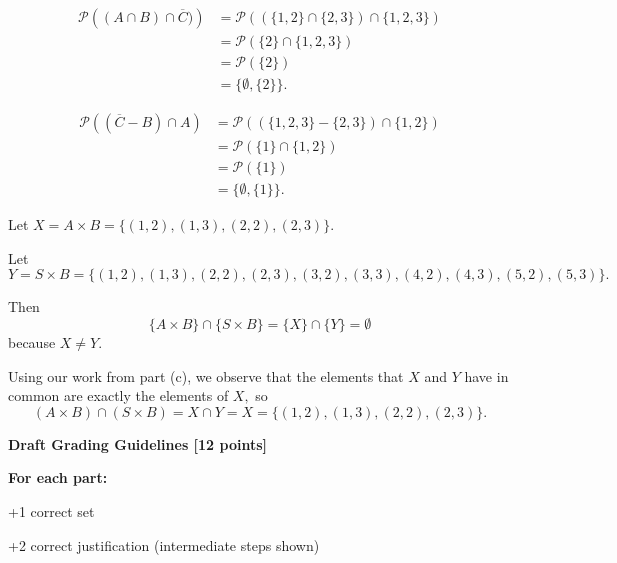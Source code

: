 \documentclass[12pt]{exam}
\begin{document}
\begin{solution}
\begin{qparts}
    \item \begin{align*}
        \mathcal{P}\left( (A \cap B) \cap \overline C ) \right) &= \mathcal{P}((\{1,2\} \cap \{2,3\})\cap \{1,2,3\}) \\
        &= \mathcal{P}(\{2\} \cap \{1,2,3\}) \\
        &= \mathcal{P}(\{2\}) \\
        &= \{\emptyset, \{2\}\}.
    \end{align*}

    \item \begin{align*}
        \mathcal{P} \left( ( \overline{C} - B ) \cap A \right) &= \mathcal{P}((\{1,2,3\} - \{2,3\}) \cap \{1,2\}) \\
        &= \mathcal{P}(\{1\} \cap \{1,2\}) \\
        &= \mathcal{P}(\{1\}) \\
        &= \{\emptyset , \{1\} \}.
    \end{align*}
    
    \item Let $X=A\times B=\{(1,2),(1,3),(2,2),(2,3)\}.$

    Let $Y=S\times B = \{(1,2),(1,3), (2,2),(2,3),(3,2),(3,3),(4,2),(4,3),(5,2),(5,3)\}.$

    Then
    $$\{A \times B\} \cap \{S \times B\} = \{X\} \cap \{Y\} = \emptyset$$
    because $X\ne Y.$
    
    \item Using our work from part (c), we observe that the elements that $X$ and $Y$ have in common are exactly the elements of $X,$ so
    $$(A\times B)\cap(S\times B) = X\cap Y = X = \{(1,2),(1,3),(2,2),(2,3)\}.$$
\end{qparts}
\textbf{Draft Grading Guidelines [12 points]}

\textbf{For each part:}
\begin{guidelines}
    \item +1 correct set
    \item +2 correct justification (intermediate steps shown)
\end{guidelines}
\end{solution}
\end{document}

